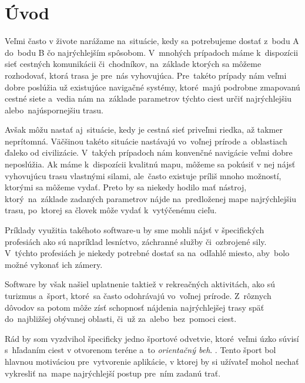 \chapter*{Úvod}

Veľmi často v živote narážame na~situácie, kedy sa potrebujeme dostať z~bodu A do~bodu B čo najrýchlejším spôsobom. V~mnohých prípadoch máme k~dispozícii sieť cestných komunikácii či~chodníkov, na~základe ktorých sa môžeme rozhodovať, ktorá trasa je pre~nás vyhovujúca. Pre~takéto prípady nám veľmi dobre poslúžia už existujúce navigačné systémy, ktoré~majú podrobne zmapovanú cestné siete a~vedia nám na~základe parametrov týchto ciest určiť najrýchlejšiu alebo~najúspornejšiu trasu.

Avšak môžu nastať aj~situácie, kedy je cestná sieť priveľmi riedka, až takmer neprítomná. Väčšinou takéto situácie nastávajú vo~voľnej prírode a~oblastiach ďaleko od civilizácie. V~takých prípadoch nám konvenčné navigácie veľmi dobre neposlúžia. Ak máme k~dispozícii kvalitnú mapu, môžeme sa pokúsiť v nej nájsť vyhovujúcu trasu vlastnými silami, ale~často existuje príliš mnoho možností, ktorými sa môžeme vydať. Preto by sa niekedy hodilo mať nástroj, ktorý~na~základe zadaných parametrov nájde na~predloženej mape najrýchlejšiu trasu, po~ktorej sa človek môže vydať k~vytýčenému cieľu.

Príklady využitia takéhoto software-u by sme mohli nájsť v špecifických profesiách ako sú napríklad lesníctvo, záchranné služby či~ozbrojené sily. V~týchto profesiách je niekedy potrebné dostať sa na~odľahlé miesto, aby~bolo možné vykonať ich zámery.

Software by však našiel uplatnenie taktiež v rekreačných aktivitách, ako sú turizmus a~šport, ktoré~sa často odohrávajú vo~voľnej prírode. Z~rôznych dôvodov sa potom môže zísť schopnosť nájdenia najrýchlejšej trasy späť do~najbližšej obývanej oblasti, či~už za~alebo~bez~pomoci ciest. 

Rád by som vyzdvihol špecificky jedno športové odvetvie, ktoré~veľmi úzko súvisí s~hľadaním ciest v otvorenom teréne a~to \textit{orientačný beh}. \cite{CoJeOrientak}. Tento šport bol hlavnou motiváciou pre~vytvorenie aplikácie, v ktorej by si užívateľ mohol nechať vykresliť na~mape najrýchlejší postup pre~ním zadanú trať. 

